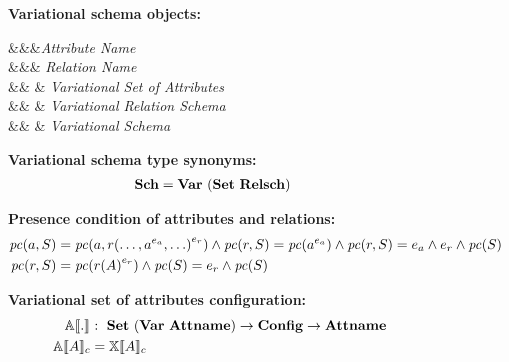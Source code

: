 \begin{figure}

\textbf{Variational schema objects:}
\begin{syntax}
\synDef \vAtt \attnametype &&&\textit{Attribute Name}\\
\synDef \vRel \relnametype &&& \textit{Relation Name}\\
\synDef \vAttList \vAttSet &\eqq& 
 & \textit{Variational Set of Attributes}\\
\synDef \vRelSch \vRelSchSet &\eqq& \vRelDef & \textit{Variational Relation Schema}\\
\synDef \vSch \vSchSet &\eqq& \vSchDef & \textit{Variational Schema}
\end{syntax}

\medskip
\textbf{Variational schema type synonyms:}
\begin{alignat*}{1}
\vSchSet &= \vartype {\left(\settype \relschtype\right)}
\end{alignat*}

\medskip
\textbf{Presence condition of attributes and relations:}
\begin{alignat*}{1}
\getPCfrom {\vAtt} {\vSch} &= \getPCfrom {\vAtt} {\vRel \annot [\dimMeta_\vRel] {(\ldots, \annot [\dimMeta_\vAtt] \vAtt, \ldots)}} \wedge \getPCfrom \vRel \vSch = \getPC {\annot [\dimMeta_\vAtt] \vAtt} \wedge \getPCfrom \vRel \vSch=
\dimMeta_\vAtt \wedge \dimMeta_\vRel \wedge \getPC \vSch\\
\getPCfrom {\vRel} \vSch &= \getPC {\vRel \annot [\dimMeta_\vRel] {(\vAttList)}} \wedge \getPC {\vSch} = \dimMeta_\vRel \wedge \getPC \vSch
\end{alignat*}

\medskip
\textbf{Variational set of attributes configuration:}
\begin{alignat*}{1}
 \olSem [] . &: \ \vAttSet \to \confSet \to \pAttSet\\
 \olSem \vAttList &= \elemSem \vAttList
 \end{alignat*}


\end{figure}
